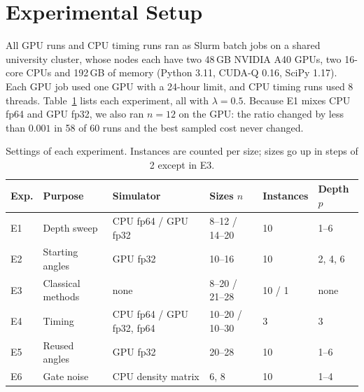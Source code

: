 
\section{Experimental Setup}
\label{sec:setup}

All GPU runs and CPU timing runs ran as Slurm batch jobs on a shared university cluster, whose nodes each have two 48\,GB NVIDIA A40 GPUs, two 16-core CPUs and 192\,GB of memory (Python 3.11, CUDA-Q 0.16, SciPy 1.17).
Each GPU job used one GPU with a 24-hour limit, and CPU timing runs used 8 threads.
Table~\ref{tab:experiments} lists each experiment, all with $\lambda = 0.5$.
Because E1 mixes CPU fp64 and GPU fp32, we also ran $n = 12$ on the GPU: the ratio changed by less than $0.001$ in 58 of 60 runs and the best sampled cost never changed.

\begin{table}[h]
  \centering
  \small
  \caption{Settings of each experiment. Instances are counted per size; sizes go up in steps of 2 except in E3.}
  \label{tab:experiments}
  \begin{tabular}{@{}llllll@{}}
    \toprule
    Exp. & Purpose & Simulator & Sizes $n$ & Instances & Depth $p$ \\
    \midrule
    E1 & Depth sweep & CPU fp64 / GPU fp32 & 8--12 / 14--20 & 10 & 1--6 \\
    E2 & Starting angles & GPU fp32 & 10--16 & 10 & 2, 4, 6 \\
    E3 & Classical methods & none & 8--20 / 21--28 & 10 / 1 & none \\
    E4 & Timing & CPU fp64 / GPU fp32, fp64 & 10--20 / 10--30 & 3 & 3 \\
    E5 & Reused angles & GPU fp32 & 20--28 & 10 & 1--6 \\
    E6 & Gate noise & CPU density matrix & 6, 8 & 10 & 1--4 \\
    \bottomrule
  \end{tabular}
\end{table}
